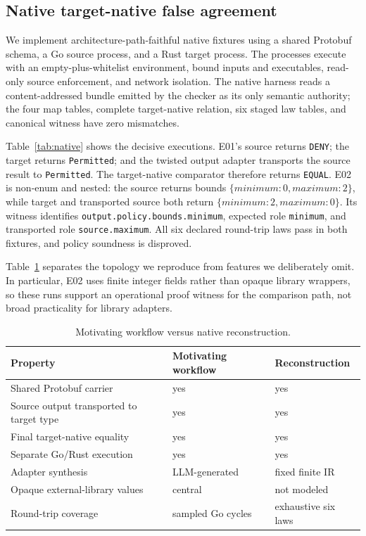 \documentclass[sigconf,anonymous,review]{acmart}
\begin{document}
\subsection{Native target-native false agreement}

We implement architecture-path-faithful native fixtures using a shared
Protobuf schema, a Go source process, and a Rust target process.  The
processes execute with an empty-plus-whitelist environment, bound
inputs and executables, read-only source enforcement, and network
isolation.  The native harness reads a content-addressed bundle emitted by
the checker as its only semantic authority; the four map tables, complete
target-native relation, six staged law tables, and canonical witness have
zero mismatches.

Table~\ref{tab:native} shows the decisive executions.  E01's source
returns \texttt{DENY}; the target returns \texttt{Permitted}; and the
twisted output adapter transports the source result to
\texttt{Permitted}.  The target-native comparator therefore returns
\texttt{EQUAL}.  E02 is non-enum and nested: the source returns bounds
$\{minimum:0,maximum:2\}$, while target and transported source both
return $\{minimum:2,maximum:0\}$.  Its witness identifies
\texttt{output.policy.bounds.minimum}, expected role
\texttt{minimum}, and transported role \texttt{source.maximum}.  All
six declared round-trip laws pass in both fixtures, and policy soundness is
disproved.

\begin{table}[t]
\caption{Separate-process native replays.}
\label{tab:native}
\centering
\scriptsize
\setlength{\tabcolsep}{2.8pt}

\end{table}

Table~\ref{tab:fidelity} separates the topology we reproduce from features
we deliberately omit.  In particular, E02 uses finite integer fields rather
than opaque library wrappers, so these runs support an operational proof
witness for the comparison path, not broad practicality for library adapters.

\begin{table}[t]
\caption{Motivating workflow versus native reconstruction.}
\label{tab:fidelity}
\centering
\scriptsize
\setlength{\tabcolsep}{2.7pt}
\begin{tabular}{p{}p{}p{}}
\toprule
Property & Motivating workflow & Reconstruction\\
\midrule
Shared Protobuf carrier & yes & yes\\
Source output transported to target type & yes & yes\\
Final target-native equality & yes & yes\\
Separate Go/Rust execution & yes & yes\\
Adapter synthesis & LLM-generated & fixed finite IR\\
Opaque external-library values & central & not modeled\\
Round-trip coverage & sampled Go cycles & exhaustive six laws\\
\bottomrule
\end{tabular}
\end{table}
\end{document}
